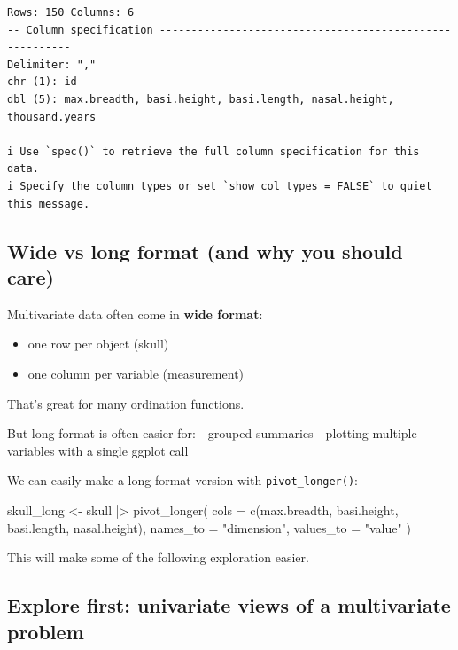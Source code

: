 \documentclass[
  letterpaper,
  8pt,
  a4paper]{book}
\newenvironment{Shaded}{\begin{snugshade}}{\end{snugshade}}
\newcommand{\AttributeTok}[1]{\textcolor[rgb]{0.40,0.45,0.13}{#1}}
\newcommand{\FunctionTok}[1]{\textcolor[rgb]{0.28,0.35,0.67}{#1}}
\newcommand{\NormalTok}[1]{\textcolor[rgb]{0.00,0.23,0.31}{#1}}
\newcommand{\OtherTok}[1]{\textcolor[rgb]{0.00,0.23,0.31}{#1}}
\newcommand{\SpecialCharTok}[1]{\textcolor[rgb]{0.37,0.37,0.37}{#1}}
\newcommand{\StringTok}[1]{\textcolor[rgb]{0.13,0.47,0.30}{#1}}
\providecommand{\tightlist}{%
  \setlength{\itemsep}{0pt}\setlength{\parskip}{0pt}}
\begin{document}
\begin{verbatim}
Rows: 150 Columns: 6
-- Column specification --------------------------------------------------------
Delimiter: ","
chr (1): id
dbl (5): max.breadth, basi.height, basi.length, nasal.height, thousand.years

i Use `spec()` to retrieve the full column specification for this data.
i Specify the column types or set `show_col_types = FALSE` to quiet this message.
\end{verbatim}

\subsection*{Wide vs long format (and why you should
care)}\label{wide-vs-long-format-and-why-you-should-care}

Multivariate data often come in \textbf{wide format}:

\begin{itemize}
\tightlist
\item
  one row per object (skull)
\item
  one column per variable (measurement)
\end{itemize}

That's great for many ordination functions.

But long format is often easier for: - grouped summaries - plotting
multiple variables with a single ggplot call

We can easily make a long format version with \texttt{pivot\_longer()}:

\begin{Shaded}
\begin{Highlighting}[]
\NormalTok{skull\_long }\OtherTok{\textless{}{-}}\NormalTok{ skull }\SpecialCharTok{|\textgreater{}}
  \FunctionTok{pivot\_longer}\NormalTok{(}
    \AttributeTok{cols =} \FunctionTok{c}\NormalTok{(max.breadth, basi.height, basi.length, nasal.height),}
    \AttributeTok{names\_to =} \StringTok{"dimension"}\NormalTok{,}
    \AttributeTok{values\_to =} \StringTok{"value"}
\NormalTok{  )}
\end{Highlighting}
\end{Shaded}

This will make some of the following exploration easier.

\subsection*{Explore first: univariate views of a multivariate
problem}\label{explore-first-univariate-views-of-a-multivariate-problem}
\end{document}
